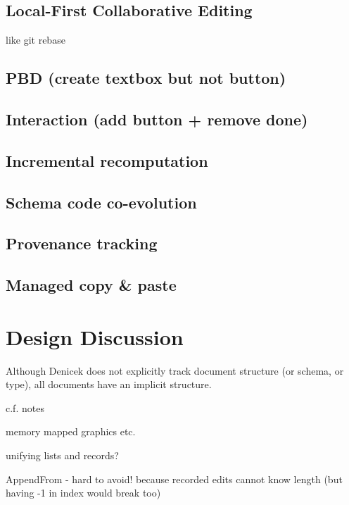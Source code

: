 \documentclass[sigconf]{acmart}
\begin{document}
\subsection{Local-First Collaborative Editing}
\label{sec:impl-collab}

like git rebase

\subsection{PBD (create textbox but not button)}
\label{sec:impl-pbd}

\subsection{Interaction (add button + remove done)}
\label{sec:impl-interaction}

\subsection{Incremental recomputation}
\label{sec:impl-eval}

\subsection{Schema code co-evolution}
\label{sec:impl-schema}

\subsection{Provenance tracking}
\label{sec:impl-provenance}

\subsection{Managed copy \& paste}
\label{sec:impl-copy}

\section{Design Discussion}


Although Denicek does not explicitly track document structure (or schema, or type), all documents
have an implicit structure.

c.f. notes

memory mapped graphics etc.

unifying lists and records?

AppendFrom - hard to avoid! because recorded edits cannot know length
(but having -1 in index would break too)
\end{document}
